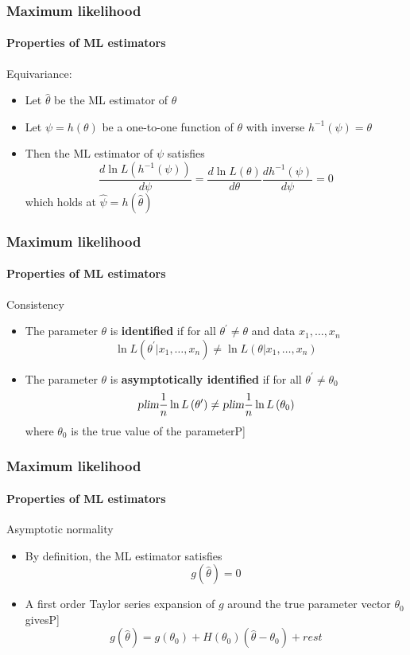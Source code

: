 \documentclass[notes=show]{beamer}
\begin{document}
\begin{frame}\frametitle{Maximum likelihood}\framesubtitle{Properties of ML estimators}
Equivariance:
\begin{itemize}
    \item Let $\hat{\theta}$ be the ML estimator of $\theta $
    \item Let $\psi =h\left( \theta \right) $ be a one-to-one function of $\theta $ with inverse $h^{-1}\left( \psi \right) =\theta $
    \item Then the ML estimator of $\psi $ satisfies
    \begin{equation*}
        \frac{d\ln L\left( h^{-1}\left( \psi \right) \right) }{d\psi }=\frac{d\ln L\left( \theta \right) }{d\theta }\frac{dh^{-1}\left( \psi \right) }{d\psi } =0
    \end{equation*}
    which holds at $\hat{\psi}=h\left( \hat{\theta}\right) $
\end{itemize}
\end{frame}


\begin{frame}\frametitle{Maximum likelihood}\framesubtitle{Properties of ML estimators}
Consistency
\begin{itemize}
    \item The parameter $\theta $ is \textbf{identified} if for all $\theta^{\prime }\neq \theta $ and data $x_{1},\ldots ,x_{n}$
    \begin{equation*}
        \ln L\left( \theta ^{\prime }|x_{1},\ldots ,x_{n}\right) \neq \ln L\left(\theta |x_{1},\ldots ,x_{n}\right)
    \end{equation*}
    \item The parameter $\theta $ is \textbf{asymptotically identified} if for all $\theta ^{\prime }\neq \theta _{0}$
    \begin{equation*}
    \textsl{plim}\frac{1}{n}\ln L\left( \theta ^{\prime }\right) \neq \textsl{plim}\frac{1}{n}\ln L\left( \theta _{0}\right)
    \end{equation*}
    where $\theta _{0}$ is the true value of the parameter\hfill \lbrack P]
\end{itemize}
\end{frame}


\begin{frame}\frametitle{Maximum likelihood}\framesubtitle{Properties of ML estimators}
Asymptotic normality
\begin{itemize}
    \item By definition, the ML estimator satisfies
    \begin{equation*}
        g(\hat{\theta})=0
    \end{equation*}
    \item A first order Taylor series expansion of $g$ around the true parameter vector $\theta _{0}$ gives\hfill \lbrack P]
    \begin{equation*}
        g(\hat{\theta})=g\left( \theta _{0}\right) +H\left( \theta _{0}\right) (\hat{\theta}-\theta _{0})+rest
    \end{equation*}
\end{itemize}
\end{frame}
\end{document}
